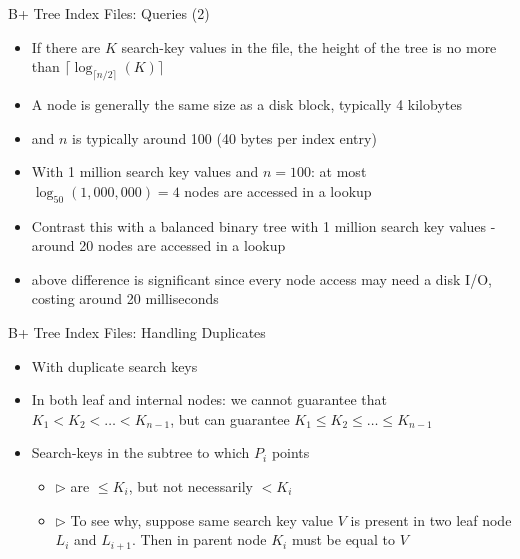 \documentclass[aspectratio=169, xcolor=dvipsnames]{beamer}
\begin{document}
\begin{frame}{B+ Tree Index Files: Queries (2)}
    \begin{itemize}[<+->]
        \item If there are $K$ search-key values in the file, the height of the tree is no more than $\lceil \log_{\lceil n/2 \rceil} (K) \rceil$
        \item A node is generally the same size as a disk block, typically 4 kilobytes
        \item and $n$ is typically around 100 (40 bytes per index entry)
        \item With 1 million search key values and $n = 100$: at most $\log_{50}(1,000,000) = 4$ nodes are accessed in a lookup
        \item Contrast this with a balanced binary tree with 1 million search key values - around 20 nodes are accessed in a lookup
        \item above difference is significant since every node access may need a disk I/O, costing around 20 milliseconds
    \end{itemize}
\end{frame}

\begin{frame}{B+ Tree Index Files: Handling Duplicates}
    \begin{itemize}[<+->]
        \item With duplicate search keys
        \item In both leaf and internal nodes: we cannot guarantee that $K_1 < K_2 < \dots < K_{n-1}$, but can guarantee $K_1 \le K_2 \le \dots \le K_{n-1}$
        \item Search-keys in the subtree to which $P_i$ points
        \begin{itemize}
            \item $\triangleright$ are $\le K_i$, but not necessarily $< K_i$
            \item $\triangleright$ To see why, suppose same search key value $V$ is present in two leaf node $L_i$ and $L_{i+1}$. Then in parent node $K_i$ must be equal to $V$
        \end{itemize}
    \end{itemize}
\end{frame}
\end{document}
